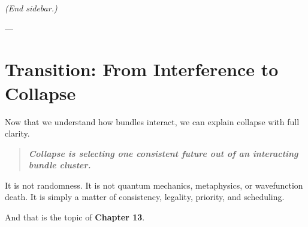 \textit{(End sidebar.)}

---

\section{\texorpdfstring{\textbf{Transition: From Interference to Collapse}}{12.14 --- Transition: From Interference to Collapse}}

Now that we understand how bundles interact, we can explain collapse with full clarity.

\begin{quote}
\itshape
\textbf{Collapse is selecting one consistent future out of an interacting bundle cluster.}
\end{quote}

It is not randomness. It is not quantum mechanics, metaphysics, or wavefunction death. It is simply a matter of consistency, legality, priority, and scheduling.

And that is the topic of \textbf{Chapter 13}.
